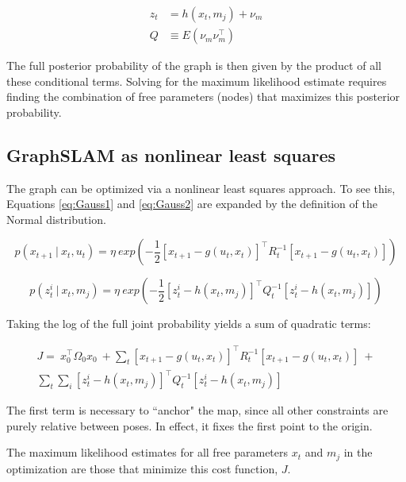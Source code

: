 \begin{align}
z_{t} &= h\left(x_t,m_j\right) + \nu_m\\
Q &\equiv E\left(\nu_m \nu_m^\intercal\right) 
\end{align}

The full posterior probability of the graph is then given by the product of all these conditional terms. Solving for the maximum likelihood estimate requires finding the combination of free parameters (nodes) that maximizes this posterior probability. 

\subsection{GraphSLAM as nonlinear least squares}

The graph can be optimized via a nonlinear least squares approach. To see this, Equations \ref{eq:Gauss1} and \ref{eq:Gauss2} are expanded by the definition of the Normal distribution.

\begin{equation}
p\left(x_{t+1}~|~x_t,u_t\right) = \eta~ exp\left(-\frac{1}{2}\left[x_{t+1} - g\left(u_t,x_t\right)\right]^{\intercal}R_t^{-1}\left[x_{t+1} - g\left(u_t,x_t\right)\right]\right)
\end{equation}

\begin{equation}
p\left(z^i_{t}~|~x_t,m_j\right) = \eta~ exp\left(-\frac{1}{2}\left[z^i_{t} - h\left(x_t,m_j\right)\right]^{\intercal}Q_t^{-1}\left[z^i_{t} - h\left(x_t,m_j\right)\right]\right)
\label{eq.measModel}
\end{equation}

Taking the log of the full joint probability yields a sum of quadratic terms:

\begin{multline}
J = ~x_0^{\intercal}\Omega_0 x_0 ~+
\sum_{t}{\left[x_{t+1} - g\left(u_t,x_t\right)\right]^{\intercal}R_t^{-1}\left[x_{t+1} - g\left(u_t,x_t\right)\right]} ~+ \\ \sum_{t}{\sum_{i}{\left[z^i_{t} - h\left(x_t,m_j\right)\right]^{\intercal}Q_t^{-1}\left[z^i_{t} - h\left(x_t,m_j\right)\right]}}
\label{eq.quadcost}
\end{multline}

The first term is necessary to ``anchor" the map, since all other constraints are purely relative between poses. In effect, it fixes the first point to the origin. 

The maximum likelihood estimates for all free parameters $x_t$ and $m_j$ in the optimization are those that minimize this cost function, $J$.

